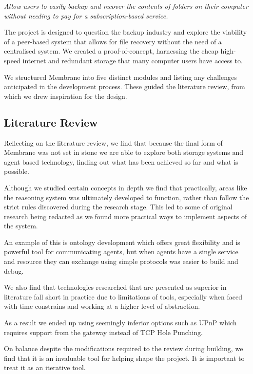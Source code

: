 \documentclass[11pt, a4paper, twocolumn, twoside]{report}
\begin{document}
\begin{displayquote}
 \emph{Allow users to easily backup and recover the contents of folders on their computer without needing to pay for a subscription-based service.}
\end{displayquote}

The project is designed to question the backup industry and explore the viability of a peer-based system that allows for file recovery without the need of a centralised system. We created a proof-of-concept, harnessing the cheap high-speed internet and redundant storage that many computer users have access to.

We structured Membrane into five distinct modules and listing any challenges anticipated in the development process. These guided the literature review, from which we drew inspiration for the design.

\subsection{Literature Review}

Reflecting on the literature review, we find that because the final form of Membrane was not set in stone we are able to explore both storage systems and agent based technology, finding out what has been achieved so far and what is possible.

Although we studied certain concepts in depth we find that practically, areas like the reasoning system was ultimately developed to function, rather than follow the strict rules discovered during the research stage. This led to some of original research being redacted as we found more practical ways to implement aspects of the system.

An example of this is ontology development which offers great flexibility and is powerful tool for communicating agents, but when agents have a single service and resource they can exchange using simple protocols was easier to build and debug.

We also find that technologies researched that are presented as superior in literature fall short in practice due to limitations of tools, especially when faced with time constrains and working at a higher level of abstraction.

As a result we ended up using seemingly inferior options such as UPnP which requires support from the gateway instead of TCP Hole Punching.

On balance despite the modifications required to the review during building, we find that it is an invaluable tool for helping shape the project. It is important to treat it as an iterative tool.
\end{document}
